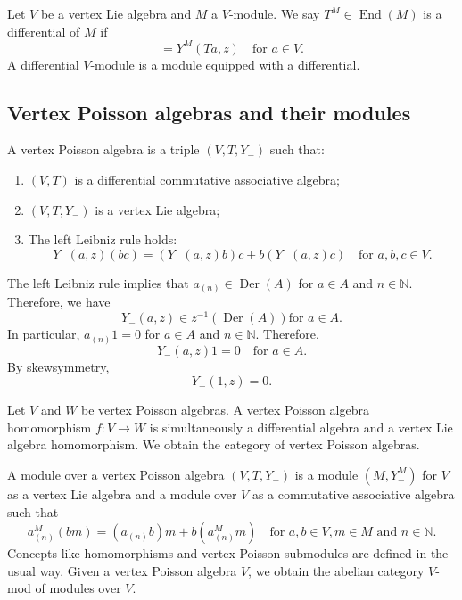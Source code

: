 \documentclass[a4paper, 12pt, reqno]{amsart}
\theoremstyle{remark}
\numberwithin{equation}{subsection}
\DeclareMathOperator{\End}{End}
\DeclareMathOperator{\Der}{Der}
\begin{document}
Let $V$ be a vertex Lie algebra and $M$ a $V$-module.
We say $T^M \in \End(M)$ is a differential of $M$ if
\begin{equation*}
  [T^M, Y^M_-(a, z)] = Y^M_-(Ta, z) \quad \text{for }a \in V.
\end{equation*}
A differential $V$-module is a module equipped with a differential.

\subsection{Vertex Poisson algebras and their modules}
\label{sec:vert-poiss-algebr-1}

A vertex Poisson algebra is a triple $(V, T, Y_-)$ such that:
\begin{enumerate}
\item $(V, T)$ is a differential commutative associative algebra;
\item $(V, T, Y_-)$ is a vertex Lie algebra;
\item The left Leibniz rule holds:
  \begin{equation*}
    Y_-(a, z)(bc) = (Y_-(a, z)b)c + b(Y_-(a, z)c) \quad \text{for }a, b, c \in V.
  \end{equation*}
\end{enumerate}
The left Leibniz rule implies that $a_{(n)} \in \Der(A)$ for $a \in A$ and $n \in \mathbb{N}$.
Therefore, we have
\begin{equation*}
  Y_-(a, z) \in z^{-1}(\Der(A)) \text{for }a \in A.
\end{equation*}
In particular, $a_{(n)}1 = 0$ for $a \in A$ and $n \in \mathbb{N}$.
Therefore,
\begin{equation*}
  Y_-(a, z)1 = 0 \quad \text{for } a \in A.
\end{equation*}
By skewsymmetry, 
\begin{equation*}
  Y_-(1,z)=0.
\end{equation*}

Let $V$ and $W$ be vertex Poisson algebras.
A vertex Poisson algebra homomorphism $f: V \to W$ is simultaneously a differential algebra and a vertex Lie algebra homomorphism.
We obtain the category of vertex Poisson algebras.

A module over a vertex Poisson algebra $(V, T, Y_-)$ is a module $(M, Y^M_-)$ for $V$ as a vertex Lie algebra and a module over $V$ as a commutative associative algebra such that
\begin{equation*}
  a^M_{(n)}(bm) = (a_{(n)}b)m+b(a^M_{(n)}m) \quad \text{for }a, b \in V, m \in M\text{ and }n \in \mathbb{N}.
\end{equation*}
Concepts like homomorphisms and vertex Poisson submodules are defined in the usual way.
Given a vertex Poisson algebra $V$, we obtain the abelian category $V$-mod of modules over $V$.
\end{document}
